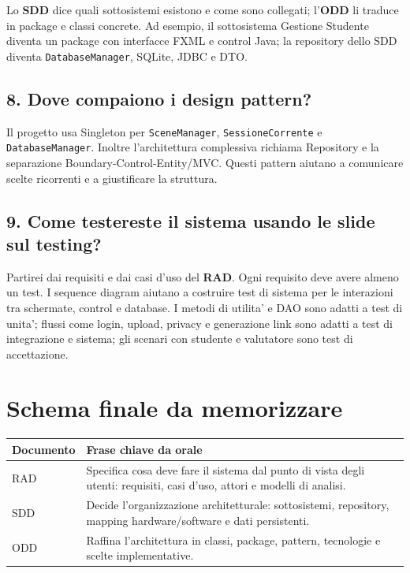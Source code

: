 ﻿\documentclass[11pt,a4paper]{article}
\newcommand{\doc}[1]{\textbf{#1}}
\begin{document}
Lo \doc{SDD} dice quali sottosistemi esistono e come sono collegati; l'\doc{ODD} li traduce
in package e classi concrete. Ad esempio, il sottosistema Gestione Studente diventa un
package con interfacce FXML e control Java; la repository dello SDD diventa
\texttt{DatabaseManager}, SQLite, JDBC e DTO.

\subsection*{8. Dove compaiono i design pattern?}

Il progetto usa Singleton per \texttt{SceneManager}, \texttt{SessioneCorrente} e
\texttt{DatabaseManager}. Inoltre l'architettura complessiva richiama Repository e la
separazione Boundary-Control-Entity/MVC. Questi pattern aiutano a comunicare scelte
ricorrenti e a giustificare la struttura.

\subsection*{9. Come testereste il sistema usando le slide sul testing?}

Partirei dai requisiti e dai casi d'uso del \doc{RAD}. Ogni requisito deve avere almeno un
test. I sequence diagram aiutano a costruire test di sistema per le interazioni tra
schermate, control e database. I metodi di utilita' e DAO sono adatti a test di unita';
flussi come login, upload, privacy e generazione link sono adatti a test di integrazione
e sistema; gli scenari con studente e valutatore sono test di accettazione.

\section{Schema finale da memorizzare}

\begin{center}
\begin{tabular}{p{3cm}p{9.8cm}}
\toprule
\textbf{Documento} & \textbf{Frase chiave da orale} \\
\midrule
RAD & Specifica cosa deve fare il sistema dal punto di vista degli utenti: requisiti,
casi d'uso, attori e modelli di analisi. \\
SDD & Decide l'organizzazione architetturale: sottosistemi, repository, mapping
hardware/software e dati persistenti. \\
ODD & Raffina l'architettura in classi, package, pattern, tecnologie e scelte
implementative. \\
\bottomrule
\end{tabular}
\end{center}
\end{document}
